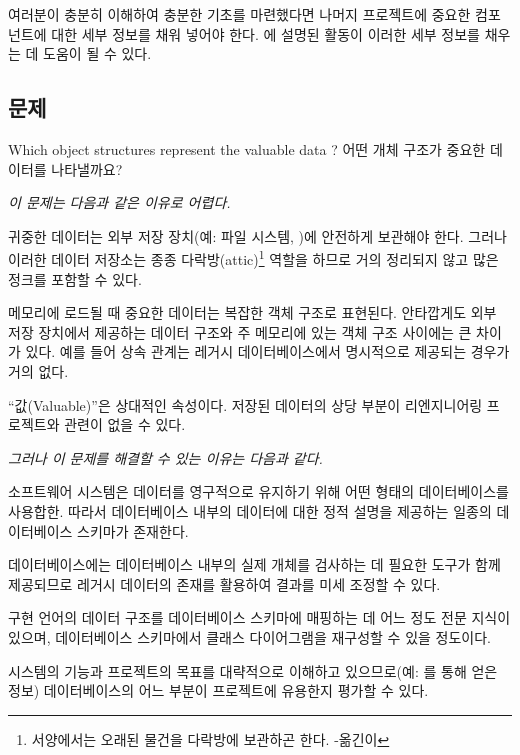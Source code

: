 \documentclass[a4paper,10pt,twoside]{book}
\begin{document}
여러분이 충분히 이해하여 충분한 기초를 마련했다면 나머지 프로젝트에 중요한 컴포넌트에 대한 세부 정보를 채워 넣어야 한다. 에 설명된 활동이 이러한 세부 정보를 채우는 데 도움이 될 수 있다.



\subsection*{문제}

Which object structures represent the valuable data ?
어떤 개체 구조가 중요한 데이터를 나타낼까요?

\emph{이 문제는 다음과 같은 이유로 어렵다.}

\begin{bulletlist}
\item 귀중한 데이터는 외부 저장 장치(예: 파일 시스템, )에 안전하게 보관해야 한다. 그러나 이러한 데이터 저장소는 종종 다락방(attic)\footnote{서양에서는 오래된 물건을 다락방에 보관하곤 한다. -옮긴이} 역할을 하므로 거의 정리되지 않고 많은 정크를 포함할 수 있다.

\item 메모리에 로드될 때 중요한 데이터는 복잡한 객체 구조로 표현된다. 안타깝게도 외부 저장 장치에서 제공하는 데이터 구조와 주 메모리에 있는 객체 구조 사이에는 큰 차이가 있다. 예를 들어 상속 관계는 레거시 데이터베이스에서 명시적으로 제공되는 경우가 거의 없다.

\item ``값(Valuable)''은 상대적인 속성이다. 저장된 데이터의 상당 부분이 리엔지니어링 프로젝트와 관련이 없을 수 있다.
\end{bulletlist}

\emph{그러나 이 문제를 해결할 수 있는 이유는 다음과 같다.}

\begin{bulletlist}
\item 소프트웨어 시스템은 데이터를 영구적으로 유지하기 위해 어떤 형태의 데이터베이스를 사용합한. 따라서 데이터베이스 내부의 데이터에 대한 정적 설명을 제공하는 일종의 데이터베이스 스키마가 존재한다.

\item 데이터베이스에는 데이터베이스 내부의 실제 개체를 검사하는 데 필요한 도구가 함께 제공되므로 레거시 데이터의 존재를 활용하여 결과를 미세 조정할 수 있다.

\item 구현 언어의 데이터 구조를 데이터베이스 스키마에 매핑하는 데 어느 정도 전문 지식이 있으며, 데이터베이스 스키마에서 클래스 다이어그램을 재구성할 수 있을 정도이다.

\item 시스템의 기능과 프로젝트의 목표를 대략적으로 이해하고 있으므로(예: 를 통해 얻은 정보) 데이터베이스의 어느 부분이 프로젝트에 유용한지 평가할 수 있다.
\end{bulletlist}
\end{document}
